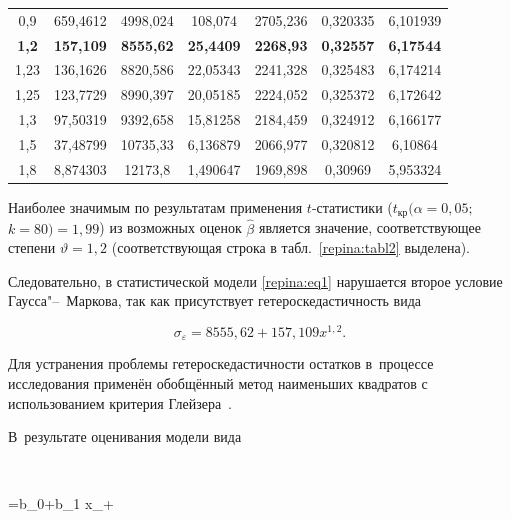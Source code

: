 \begin{table}[h!]
\begin{minipage}{.9\textwidth}
\begin{tabular}{c|c|c|c|c|c|c}
0,9 & 659,4612 & 4998,024 & 108,074 & 2705,236 & 0,320335 & 6,101939 \\ 

\bf 1,2 & \bf 157,109 & \bf  8555,62 & \bf  25,4409 & \bf  2268,93 & \bf  0,32557 & \bf  6,17544 \\ 

1,23& 136,1626& 8820,586&  22,05343& 2241,328 & 0,325483 & 6,174214 \\ 

1,25& 123,7729& 8990,397& 20,05185& 2224,052& 0,325372& 6,172642 \\ 

1,3 & 97,50319& 9392,658& 15,81258& 2184,459& 0,324912& 6,166177 \\ 

1,5 & 37,48799& 10735,33& 6,136879& 2066,977& 0,320812& 6,10864 \\ 

1,8& 8,874303& 12173,8& 1,490647& 1969,898& 0,30969& 5,953324 \\ \hline

\end{tabular}



\end{minipage}



\end{table}



Наиболее значимым по результатам применения $t$-статистики ($t_{\text{кр}}({\alpha{=}0,05};$ $ {k=80})=1,99$) из возможных оценок $\hat{\beta}$ является значение, соответствующее степени $\vartheta=1,2$ (соответствующая строка в табл.~\ref{repina:tabl2} выделена). 

Следовательно, в статистической модели \eqref{repina:eq1} нарушается второе условие Гаусса"--~Маркова, так как присутствует гетероскедастичность вида

$$

\sigma_\varepsilon=8555,62+157,109x^{1,2}.

$$



Для устранения проблемы гетероскедастичности остатков в~процессе исследования применён обобщённый метод наименьших квадратов с использованием критерия Глейзера~\cite[стр.~688]{repina:bib7}. 

В~результате оценивания модели вида 

$$

=b_0+b_1 \cfrac x{\sigma_\varepsilon}+\cfrac \varepsilon{\sigma_\varepsilon}

